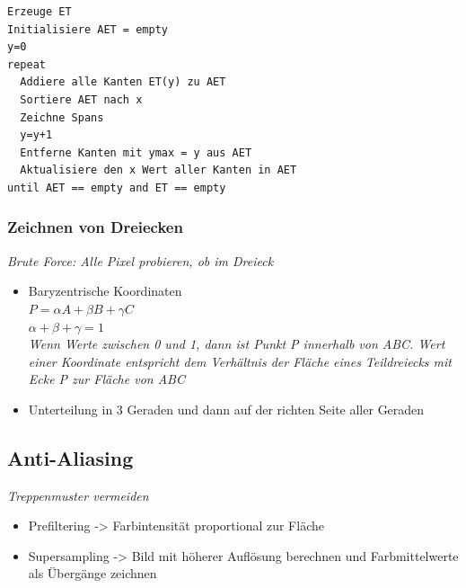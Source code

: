 \begin{lstlisting}
Erzeuge ET
Initialisiere AET = empty
y=0 
repeat
  Addiere alle Kanten ET(y) zu AET
  Sortiere AET nach x
  Zeichne Spans
  y=y+1
  Entferne Kanten mit ymax = y aus AET
  Aktualisiere den x Wert aller Kanten in AET
until AET == empty and ET == empty
\end{lstlisting}

\subsubsection{Zeichnen von Dreiecken}

\textit{Brute Force: Alle Pixel probieren, ob im Dreieck}

\begin{itemize}
	\item Baryzentrische Koordinaten\\
	$P = \alpha A + \beta B + \gamma C$\\
	$\alpha+\beta+\gamma =1$\\
	\textit{Wenn Werte zwischen 0 und 1, dann ist Punkt P innerhalb von ABC. Wert einer Koordinate entspricht dem Verhältnis der Fläche eines Teildreiecks mit Ecke P zur Fläche von ABC}
	
	\item Unterteilung in 3 Geraden und dann auf der richten Seite aller Geraden
\end{itemize}

\subsection{Anti-Aliasing}
\textit{Treppenmuster vermeiden}
\begin{itemize}
	\item Prefiltering -> Farbintensität proportional zur Fläche
	\item Supersampling -> Bild mit höherer Auflösung berechnen und Farbmittelwerte als Übergänge zeichnen
\end{itemize}
